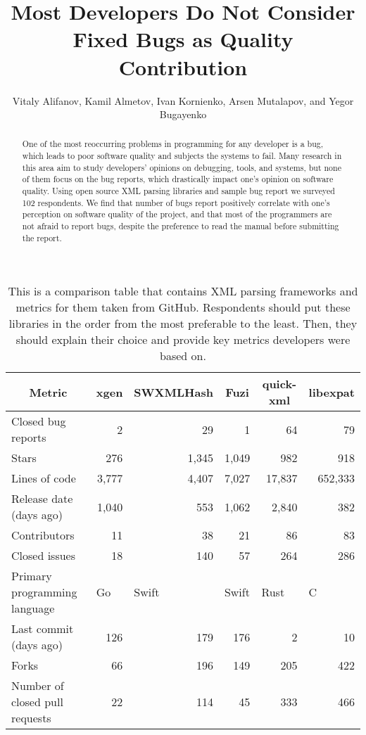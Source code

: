 \documentclass[11pt,review,sigplan,nonacm,natbib=false]{acmart}
\title{Most Developers Do Not Consider Fixed Bugs as Quality Contribution}
\author{Vitaly Alifanov, Kamil Almetov, Ivan Kornienko, Arsen Mutalapov, and Yegor Bugayenko}
\affiliation{\institution{Innopolis University}\city{Innopolis}\country{Russia}}
\begin{document}
\begin{abstract}
One of the most reoccurring problems in programming for any developer is a bug, which leads to poor software quality and subjects the systems to fail. Many research in this area aim to study developers' opinions on debugging, tools, and systems, but none of them focus on the bug reports, which drastically impact one's opinion on software quality. Using open source XML parsing libraries and sample bug report we surveyed 102 respondents. We find that number of bugs report positively correlate with one's perception on software quality of the project, and that most of the programmers are not afraid to report bugs, despite the preference to read the manual before submitting the report.
\end{abstract}

\maketitle

\begin{table*}
    \begin{tabularx}{\textwidth}{l *{5}{r}}
    \toprule
    \multicolumn{1}{c}{Metric} & \multicolumn{1}{c}{xgen} & \multicolumn{1}{c}{SWXMLHash} 
    & \multicolumn{1}{c}{Fuzi} & \multicolumn{1}{c}{quick-xml} & \multicolumn{1}{c}{libexpat} \\
    \midrule
    Closed bug reports & 2 & 29 & 1 & 64 & 79 \\
    Stars & 276 & 1{,}345 & 1{,}049 & 982 & 918 \\
    Lines of code & 3{,}777 & 4{,}407 & 7{,}027 & 17{,}837 & 652{,}333 \\
    Release date (days ago)& 1{,}040 & 553 & 1{,}062 & 2{,}840 & 382 \\
    Contributors & 11 & 38 & 21 & 86 & 83 \\
    Closed issues & 18 & 140 & 57 & 264 & 286 \\
    \multicolumn{1}{l}{Primary programming language} & \multicolumn{1}{l}{Go} & 
    \multicolumn{1}{l}{Swift} & \multicolumn{1}{l}{Swift} & \multicolumn{1}{l}{Rust} & \multicolumn{1}{l}{C} \\
    Last commit (days ago) & 126 & 179 & 176 & 2 & 10 \\
    Forks & 66 & 196 & 149 & 205 & 422 \\
    Number of closed pull requests & 22 & 114 & 45 & 333 & 466 \\
    \bottomrule
    \end{tabularx}
\caption{This is a comparison table that contains XML parsing frameworks and metrics for them taken from GitHub. Respondents should put these libraries in the order from the most preferable to the least. Then, they should explain their choice and provide key metrics developers were based on.}
\label{tab:frameworks}
\end{table*}
\end{document}

